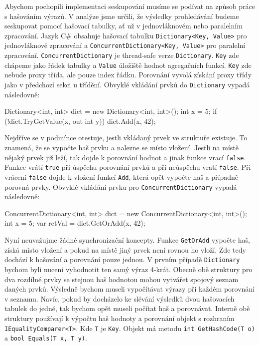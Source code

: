 Abychom pochopili implementaci seskupování musíme se podívat na způsob práce s hašováním výrazů.
V analýze jsme určili, že výsledky prohledávání budeme seskupovat pomocí hašovací tabulky, ať už v jednovláknovém nebo paralelním zpracování.
Jazyk C\# obsahuje hašovací tabulku \texttt{Dictionary<Key, Value>} pro jednovláknové zpracování a \texttt{ConcurrentDictionary<Key, Value>} pro paralelní zpracování.
\texttt{ConcurrentDictionary} je thread-safe verze \texttt{Dictionary}. 
\texttt{Key} zde chápeme jako řádek tabulky a \texttt{Value} úložiště hodnot agregačních funkcí. 
\texttt{Key} zde nebude proxy třída, ale pouze index řádku.
Porovnání vyvolá získání proxy třídy jako v předchozí sekci u třídění.
Obvyklé vkládání prvků do \texttt{Dictionary} vypadá následovně:
\begin{code}
Dictionary<int, int> dict = new Dictionary<int, int>();
int x = 5;
if (!dict.TryGetValue(x, out int y)) dict.Add(x, 42);
\end{code}
Nejdříve se v podmínce otestuje, jestli vkládaný prvek ve struktuře existuje.
To znamená, že se vypočte haš prvku a nalezne se místo vložení.
Jestli na místě nějaký prvek již leží, tak dojde k porovnání hodnot a jinak funkce vrací \texttt{false}.
Funkce vrátí \texttt{true} při úspěchu porovnání prvků a při neúspěchu vratí \texttt{false}.
Při vrácení \texttt{false} dojde k vložení funkcí \texttt{Add}, která opět vypočte haš a případně porovná prvky.
Obvyklé vkládání prvku pro \texttt{ConcurrentDictionary} vypadá následovně:
\begin{code}
ConcurrentDictionary<int, int> dict = 
    new ConcurrentDictionary<int, int>();
int x = 5;
var retVal = dict.GetOrAdd(x, 42);
\end{code}
Nyní neuvažujme žádné synchronizační koncepty.
Funkce \texttt{GetOrAdd} vypočte haš, získá místo vložení a pokud na místě jiný prvek není rovnou ho vloží.
Zde tedy dochází k hašování a porovnání pouze jednou.
V prvním případě \texttt{Dictionary} bychom byli nuceni vyhodnotit ten samý výraz 4-krát.
Obecně obě struktury pro dva rozdílné prvky se stejnou haš hodnotou mohou vytvářet spojový seznam daných prvků.
Výsledně bychom museli vypočítávat výrazy při každém porovnání v seznamu.
Navíc, pokud by docházelo ke slévání výsledků dvou hašovacích tabulek do jedné, tak bychom opět museli počítat haš a porovnávat.
Interně obě struktury používají k výpočtu haš hodnoty a porovnání objekt s rozhraním \texttt{IEqualityComparer<T>}.
Kde \texttt{T} je \texttt{Key}. 
Objekt má metodu \texttt{int GetHashCode(T o)} a \texttt{bool Equals(T x, T y)}.

